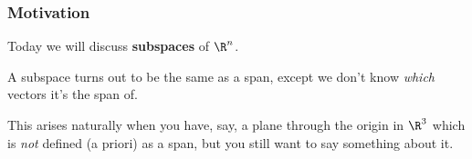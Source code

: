 




\begin{frame}
\frametitle{Motivation}

Today we will discuss \textbf{subspaces} of $\R^n$.

\pause\medskip
A subspace turns out to be the same as a span, except we don't know \emph{which}
vectors it's the span of.

\pause\medskip
This arises naturally when you have, say, a plane through the origin in $\R^3$
which is \emph{not} defined (a priori) as a span, but you still want to say
something about it.

\begin{center}
\end{center}
\end{frame}



